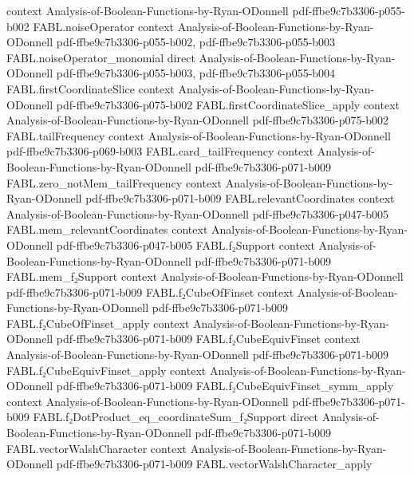 \begin{theorem}
  {context}
  {Analysis-of-Boolean-Functions-by-Ryan-ODonnell}
  {pdf-ffbe9c7b3306-p055-b002}
\proofstep
  {FABL.noiseOperator}
  {context}
  {Analysis-of-Boolean-Functions-by-Ryan-ODonnell}
  {pdf-ffbe9c7b3306-p055-b002,
    pdf-ffbe9c7b3306-p055-b003}
\proofstep
  {FABL.noiseOperator_monomial}
  {direct}
  {Analysis-of-Boolean-Functions-by-Ryan-ODonnell}
  {pdf-ffbe9c7b3306-p055-b003,
    pdf-ffbe9c7b3306-p055-b004}
\proofstep
  {FABL.firstCoordinateSlice}
  {context}
  {Analysis-of-Boolean-Functions-by-Ryan-ODonnell}
  {pdf-ffbe9c7b3306-p075-b002}
\proofstep
  {FABL.firstCoordinateSlice_apply}
  {context}
  {Analysis-of-Boolean-Functions-by-Ryan-ODonnell}
  {pdf-ffbe9c7b3306-p075-b002}
\proofstep
  {FABL.tailFrequency}
  {context}
  {Analysis-of-Boolean-Functions-by-Ryan-ODonnell}
  {pdf-ffbe9c7b3306-p069-b003}
\proofstep
  {FABL.card_tailFrequency}
  {context}
  {Analysis-of-Boolean-Functions-by-Ryan-ODonnell}
  {pdf-ffbe9c7b3306-p071-b009}
\proofstep
  {FABL.zero_notMem_tailFrequency}
  {context}
  {Analysis-of-Boolean-Functions-by-Ryan-ODonnell}
  {pdf-ffbe9c7b3306-p071-b009}
\proofstep
  {FABL.relevantCoordinates}
  {context}
  {Analysis-of-Boolean-Functions-by-Ryan-ODonnell}
  {pdf-ffbe9c7b3306-p047-b005}
\proofstep
  {FABL.mem_relevantCoordinates}
  {context}
  {Analysis-of-Boolean-Functions-by-Ryan-ODonnell}
  {pdf-ffbe9c7b3306-p047-b005}
\proofstep
  {FABL.f₂Support}
  {context}
  {Analysis-of-Boolean-Functions-by-Ryan-ODonnell}
  {pdf-ffbe9c7b3306-p071-b009}
\proofstep
  {FABL.mem_f₂Support}
  {context}
  {Analysis-of-Boolean-Functions-by-Ryan-ODonnell}
  {pdf-ffbe9c7b3306-p071-b009}
\proofstep
  {FABL.f₂CubeOfFinset}
  {context}
  {Analysis-of-Boolean-Functions-by-Ryan-ODonnell}
  {pdf-ffbe9c7b3306-p071-b009}
\proofstep
  {FABL.f₂CubeOfFinset_apply}
  {context}
  {Analysis-of-Boolean-Functions-by-Ryan-ODonnell}
  {pdf-ffbe9c7b3306-p071-b009}
\proofstep
  {FABL.f₂CubeEquivFinset}
  {context}
  {Analysis-of-Boolean-Functions-by-Ryan-ODonnell}
  {pdf-ffbe9c7b3306-p071-b009}
\proofstep
  {FABL.f₂CubeEquivFinset_apply}
  {context}
  {Analysis-of-Boolean-Functions-by-Ryan-ODonnell}
  {pdf-ffbe9c7b3306-p071-b009}
\proofstep
  {FABL.f₂CubeEquivFinset_symm_apply}
  {context}
  {Analysis-of-Boolean-Functions-by-Ryan-ODonnell}
  {pdf-ffbe9c7b3306-p071-b009}
\proofstep
  {FABL.f₂DotProduct_eq_coordinateSum_f₂Support}
  {direct}
  {Analysis-of-Boolean-Functions-by-Ryan-ODonnell}
  {pdf-ffbe9c7b3306-p071-b009}
\proofstep
  {FABL.vectorWalshCharacter}
  {context}
  {Analysis-of-Boolean-Functions-by-Ryan-ODonnell}
  {pdf-ffbe9c7b3306-p071-b009}
\proofstep
  {FABL.vectorWalshCharacter_apply}

\end{theorem}
